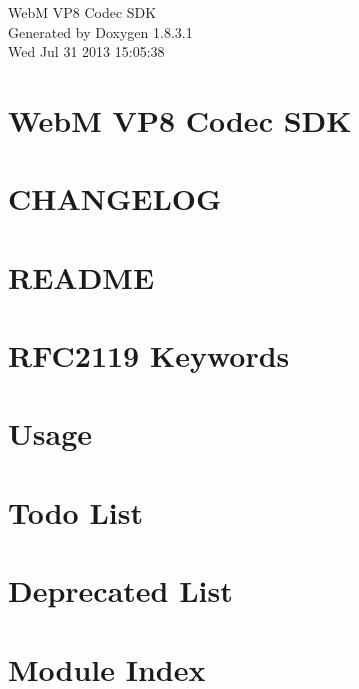 \documentclass{article}
\begin{document}
\hypersetup{pageanchor=false,citecolor=blue}
\begin{titlepage}
\vspace*{7cm}
\begin{center}
{\Large Web\-M V\-P8 Codec S\-D\-K }\\
\vspace*{1cm}
{\large Generated by Doxygen 1.8.3.1}\\
\vspace*{0.5cm}
{\small Wed Jul 31 2013 15:05:38}\\
\end{center}
\end{titlepage}
\tableofcontents
{}
\hypersetup{pageanchor=true,citecolor=blue}
\section{Web\-M V\-P8 Codec S\-D\-K}
\label{index}\hypertarget{index}{}
\section{C\-H\-A\-N\-G\-E\-L\-O\-G}
\label{changelog}
\hypertarget{changelog}{}

\section{R\-E\-A\-D\-M\-E}
\label{readme}
\hypertarget{readme}{}

\section{R\-F\-C2119 Keywords}
\label{rfc2119}
\hypertarget{rfc2119}{}

\section{Usage}
\label{usage}
\hypertarget{usage}{}

\section{Todo List}
\label{todo}
\hypertarget{todo}{}

\section{Deprecated List}
\label{deprecated}
\hypertarget{deprecated}{}

\section{Module Index}

\end{document}

